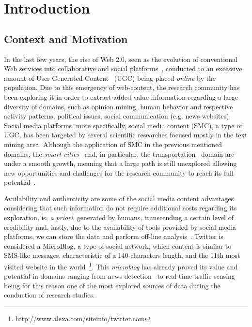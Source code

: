 \chapter{Introduction} \label{chap:intro}

\minitoc \mtcskip \noindent

\section{Context and Motivation}\label{sec:context_motivation}

In the last few years, the rise of Web 2.0, seen as the evolution of conventional Web services into collaborative and social platforms~\cite{chi2008social}, conducted to an excessive amount of User Generated Content~\cite{kaplan2010users} (UGC) being placed \textit{online} by the population. Due to this emergency of web-content, the research community has been exploring it in order to extract added-value information regarding a large diversity of domains, such as opinion mining, human behavior and respective activity patterns, political issues, social communication (e.g. news websites). Social media platforms, more specifically, social media content (SMC), a type of UGC, has been targeted by several scientific researches focused mostly in the text mining area. Although the application of SMC in the previous mentioned domains, the \textit{smart cities}~\cite{batty2012smart} and, in particular, the transportation~\cite{gal2014potential} domain are under a smooth growth, meaning that a large path is still unexplored allowing new opportunities and challenges for the research community to reach its full potential~\cite{kn:Musto2015}.

Availability and authenticity are some of the social media content advantages considering that such information do not require additional costs regarding its exploration, is, \textit{a priori}, generated by humans, transcending a certain level of credibility and, lastly, due to the availability of tools provided by social media platforms, we can store the data and perform off-line analysis~\cite{kuflik2017automating}. Twitter is considered a MicroBlog, a type of social network, which content is similar to SMS-like messages, characteristic of a 140-characters length, and the 11th most visited website in the world~\footnote{http://www.alexa.com/siteinfo/twitter.com}. This \textit{microblog} has already proved its value and potential in domains ranging from news detection~\cite{kn:Sankaranarayanan2009} to real-time traffic sensing~\cite{carvalho2010real} being for this reason one of the most explored sources of data during the conduction of research studies.

